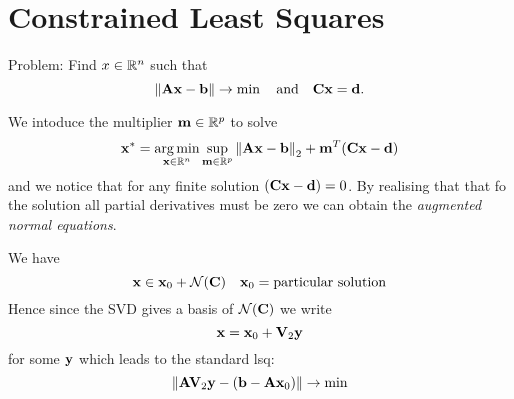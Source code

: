 \section{Constrained Least Squares}
Problem: Find $x\in \mathbb{R}^n$ such that
$$\left\lVert \mathbf{A}\mathbf{x}-\mathbf{b} \right\rVert\rightarrow \min \quad \text{and} \quad \mathbf{C}\mathbf{x} = \mathbf{d}.$$

 We intoduce the multiplier $\mathbf{m} \in \mathbb{R}^p$ to solve
$$ \mathbf{x}^* = \operatorname*{arg\,min}_{\mathbf{x}\in\mathbb{R}^n}\sup_{\mathbf{m}\in\mathbb{R}^p}\left\lVert \mathbf{A}\mathbf{x}-\mathbf{b} \right\rVert_2 + \mathbf{m}^T(\mathbf{C}\mathbf{x}-\mathbf{d})$$
and we notice that for any finite solution $(\mathbf{C}\mathbf{x}-\mathbf{d})=0$. By realising that that fo the solution all partial derivatives must be zero we can obtain the \textit{augmented normal equations}.

\Method[By SVD] We have
$$\mathbf{x} \in \mathbf{x}_0 + \mathcal{N}(\mathbf{C}) \quad \mathbf{x}_0 = \text{particular solution}$$ 
Hence since the SVD gives a basis of $\mathcal{N}(\mathbf{C})$ we write
$$\mathbf{x} = \mathbf{x}_0 + \mathbf{V}_2\mathbf{y}$$
for some $\mathbf{y}$ which leads to the standard lsq:
$$\left\lVert \mathbf{A}\mathbf{V}_2\mathbf{y}-(\mathbf{b}-\mathbf{A}\mathbf{x}_0) \right\rVert\rightarrow \min$$